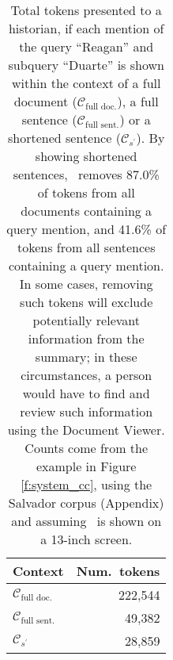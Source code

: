 {

\begin{table}[t!]
\centering
\begin{tabular}{@{}l r@{}}
\toprule
Context       & {Num.\ tokens} \\ \hline 
$\mathcal{C}_{\text{full doc.}} $      & 222,544   \\ 
$\mathcal{C}_{\text{full sent.}}$   & 49,382      \\
$\mathcal{C}_{s^\prime}$  & 28,859    \\  \bottomrule
\end{tabular}
\caption[A quantitative view of how \ours~eases reading burden]{
Total tokens presented to a historian, if each mention of the query ``Reagan'' and subquery ``Duarte'' is shown within the context of a full document ($\mathcal{C}_{\text{full doc.}}$), a full sentence  ($\mathcal{C}_{\text{full sent.}}$) or a shortened sentence ($\mathcal{C}_{s^\prime}$).
By showing shortened sentences, \ours~removes 87.0\% of tokens from all documents containing a query mention, and 41.6\% of tokens from all sentences containing a query mention.
In some cases, removing such tokens will exclude potentially relevant information from the summary; 
in these circumstances, a person would have to find and review such information using the Document Viewer.
Counts come from the example in Figure  \ref{f:system_cc}, using the Salvador corpus (Appendix) and assuming \ours~is shown on a 13-inch screen.
}\label{t:tokens}
\end{table}
}




